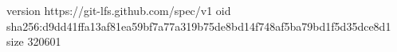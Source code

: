 version https://git-lfs.github.com/spec/v1
oid sha256:d9dd41ffa13af81ea59bf7a77a319b75de8bd14f748af5ba79bd1f5d35dce8d1
size 320601
